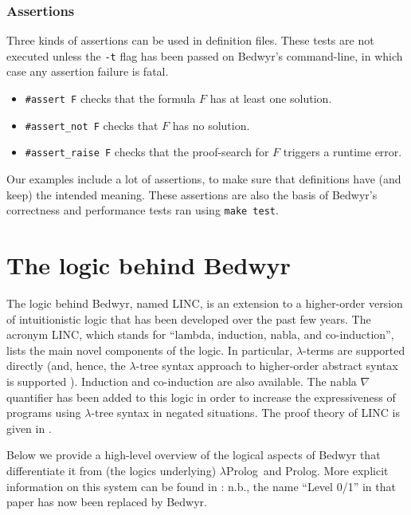 \documentclass{article}
\newcommand{\lp}{$\lambda$Prolog}
\begin{document}
\subsubsection{Assertions}

Three kinds of assertions can be used in definition files.
These tests are not executed unless the \verb.-t. flag has been passed 
on Bedwyr's command-line, in which case any assertion failure is fatal.
\begin{itemize}
\item
\verb.#assert F. checks that the formula $F$ has at least one solution.
\item
\verb.#assert_not F. checks that $F$ has no solution.
\item
\verb.#assert_raise F. checks that the proof-search for $F$ triggers
a runtime error.
\end{itemize}

Our examples include a lot of assertions, to make sure that definitions have 
(and keep) the intended meaning. These assertions are also the basis of
Bedwyr's correctness and performance tests ran using \verb.make test..

\section{The logic behind Bedwyr}
\label{logic}

The logic behind Bedwyr, named LINC, is an extension to a higher-order
version of intuitionistic logic that has been developed over the past
few years.  The acronym LINC, which stands for ``lambda, induction,
nabla, and co-induction'', lists the main novel components of the
logic.  In particular, $\lambda$-terms are supported directly (and,
hence, the $\lambda$-tree syntax approach to higher-order abstract
syntax is supported \cite{miller00cl}).  Induction and co-induction
are also available.  The nabla $\nabla$ quantifier has been added to
this logic in order to increase the expressiveness of programs using
$\lambda$-tree syntax in negated situations.  The proof theory of LINC
is given in \cite{miller05tocl,tiu04phd}.

Below we provide a high-level overview of the
logical aspects of Bedwyr that differentiate it from (the logics
underlying) \lp\ and Prolog.  More explicit information on this system
can be found in \cite{tiu05eshol}: n.b., the name ``Level 0/1'' in
that paper has now been replaced by Bedwyr.
\end{document}

